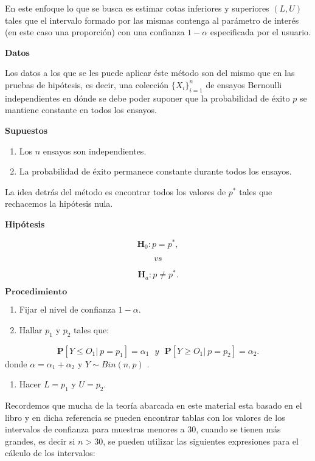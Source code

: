 \documentclass[
  a4paper,
  oneside,
  openany]{book}
\providecommand{\tightlist}{%
  \setlength{\itemsep}{0pt}\setlength{\parskip}{0pt}}
\begin{document}
En este enfoque lo que se busca es estimar cotas inferiores y superiores \((L,U)\) tales que el intervalo formado por las mismas contenga al parámetro de interés (en este caso una proporción) con una confianza \(1-\alpha\) especificada por el usuario.

\textbf{Datos}

Los datos a los que se les puede aplicar éste método son del mismo que en las pruebas de hipótesis, es decir, una colección \(\{X_{i}\}_{i=1}^n\) de ensayos Bernoulli independientes en dónde se debe poder suponer que la probabilidad de éxito \(p\) se mantiene constante en todos los ensayos.

\textbf{Supuestos}

\begin{enumerate}
\def\labelenumi{\arabic{enumi})}
\item
  Los \(n\) ensayos son independientes.
\item
  La probabilidad de éxito permanece constante durante todos los ensayos.
\end{enumerate}

La idea detrás del método es encontrar todos los valores de \(p^*\) tales que rechacemos la hipótesis nula.

\textbf{Hipótesis}

\[\textbf{H}_{0}: p = p^*,\]

\[vs\]

\[\textbf{H}_{a}: p \neq p^*.\]

\(\mathbf{Procedimiento}\)

\begin{enumerate}
\def\labelenumi{\arabic{enumi})}
\item
  Fijar el nivel de confianza \(1-\alpha.\)
\item
  Hallar \(p_{1}\) y \(p_{2}\) tales que:
\end{enumerate}

\[\mathbf{P}[Y\leq O_{1}| \ p=p_{1}]= \alpha_{1} \ \ \ y \ \ \ \mathbf{P}[Y\geq O_{1}| \ p=p_{2}]= \alpha_{2}.\]
donde \(\alpha=\alpha_{1}+\alpha_{2}\) y \(Y \sim Bin (n,p)\) .

\begin{enumerate}
\def\labelenumi{\arabic{enumi})}
\setcounter{enumi}{2}
\tightlist
\item
  Hacer \(L= p_{1}\) y \(U=p_{2}.\)
\end{enumerate}

Recordemos que mucha de la teoría abarcada en este material esta basado en el libro \citet{conover1998practical} y en dicha referencia se pueden encontrar tablas con los valores de los intervalos de confianza para muestras menores a 30, cuando se tienen más grandes, es decir si \(n>30\), se pueden utilizar las siguientes expresiones para el cálculo de los intervalos:
\end{document}
